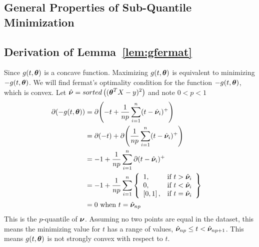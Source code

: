 \documentclass{article} %
\begin{document}
\begin{appendices}
	
	\newpage
	\section{General Properties of Sub-Quantile Minimization}\label{app:general-proofs}
	\subsection{Derivation of Lemma~\ref{lem:gfermat}}
	\label{app:gfermat}
	Since $\displaystyle g(t,{\bm{\theta}})$ is a concave function. Maximizing $g(t,{\bm{\theta}})$ is equivalent to minimizing $-g(t,{\bm{\theta}})$. We will find fermat's optimality condition for the function $\displaystyle -g(t,{\bm{\theta}})$, which is convex. 
	Let $\displaystyle \hat{{\bm{\nu}}} = sorted\left(({\bm{\theta}}^T X - y)^2\right)$ and note $\displaystyle 0 < p < 1$
	\begin{align}
		\partial{\displaystyle (-g(t,\boldsymbol{\theta}})) &= \partial{\left(-t + \frac{1}{np}\sum_{i=1}^{n}(t-\hat{{\bm{\nu}}}_i)^+\right)} &&\\
		&= \partial{(-t)} + \partial{\left(\frac{1}{np}\sum_{i=1}^{n}(t-\hat{{\bm{\nu}}}_i)^+\right)}&&\\
		&= -1 + \frac{1}{np}\sum_{i=1}^{n}\partial{(t-\hat{{\bm{\nu}}}_i)^+} &&\\
		&= -1 + \frac{1}{np}\sum_{i=1}^{n}
		\left\{
		\begin{array}{lr}
			1, & \text{if } t > \hat{{\bm{\nu}}}_i\\
			0, & \text{if } t < \hat{{\bm{\nu}}}_i \\
			\left[0,1\right], & \text{if } t = \hat{{\bm{\nu}}}_i \\
		\end{array}
		\right\}&&\\
		&= 0 \text{ when }\displaystyle t = \hat{{\bm{\nu}}}_{np}&&
	\end{align}
	This is the $p$-quantile of $\displaystyle {\bm{\nu}}$. Assuming no two points are equal in the dataset, this means the minimizing value for $t$ has a range of values, $\hat{{\bm{\nu}}}_{np} \leq t < \hat{{\bm{\nu}}}_{np+1}$. This means $g(t,{\bm{\theta}})$ is not strongly convex with respect to $t$. 

\end{appendices}
\end{document}
